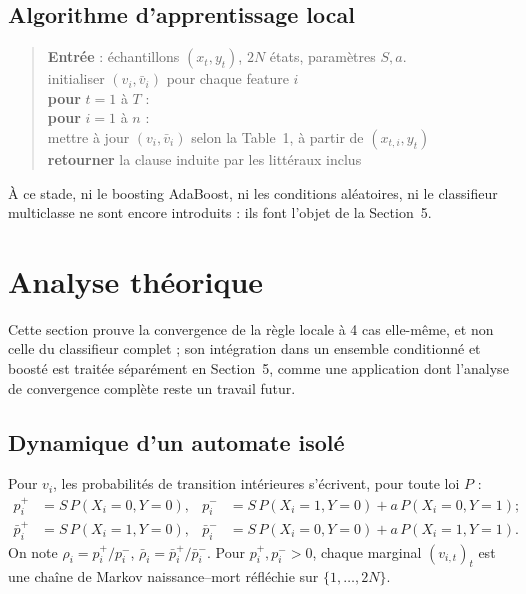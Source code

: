 \documentclass[12pt,a4paper]{article}
\newcommand{\vbar}{\bar{v}}
\begin{document}
\subsection{Algorithme d'apprentissage local}

\begin{quote}\ttfamily\small
\textbf{Entrée} : échantillons $(x_t,y_t)$, $2N$ états, paramètres $S,a$.\\[4pt]
initialiser $(v_i,\vbar_i)$ pour chaque feature $i$\\
\textbf{pour} $t = 1$ à $T$ :\\
\hspace*{1.5em}\textbf{pour} $i = 1$ à $n$ :\\
\hspace*{3em}mettre à jour $(v_i,\vbar_i)$ selon la Table~1, à partir de $(x_{t,i},y_t)$\\
\textbf{retourner} la clause induite par les littéraux inclus
\end{quote}

À ce stade, ni le boosting AdaBoost, ni les conditions aléatoires, ni le
classifieur multiclasse ne sont encore introduits : ils font l'objet de la
Section~5.

\section{Analyse théorique}

Cette section prouve la convergence de la règle locale à 4 cas elle-même,
et non celle du classifieur complet ; son intégration dans un ensemble
conditionné et boosté est traitée séparément en Section~5, comme une
application dont l'analyse de convergence complète reste un travail futur.

\subsection{Dynamique d'un automate isolé}

Pour $v_i$, les probabilités de transition intérieures s'écrivent, pour
toute loi $P$ :
\begin{align}
  p_i^+ &= S\,P(X_i{=}0,Y{=}0), & p_i^- &= S\,P(X_i{=}1,Y{=}0) + a\,P(X_i{=}0,Y{=}1); \label{eq:pv}\\
  \bar p_i^+ &= S\,P(X_i{=}1,Y{=}0), & \bar p_i^- &= S\,P(X_i{=}0,Y{=}0) + a\,P(X_i{=}1,Y{=}1). \label{eq:pvbar}
\end{align}
On note $\rho_i=p_i^+/p_i^-$, $\bar\rho_i=\bar p_i^+/\bar p_i^-$. Pour
$p_i^+,p_i^->0$, chaque marginal $(v_{i,t})_t$ est une chaîne de Markov
naissance--mort réfléchie sur $\{1,\ldots,2N\}$.
\end{document}

